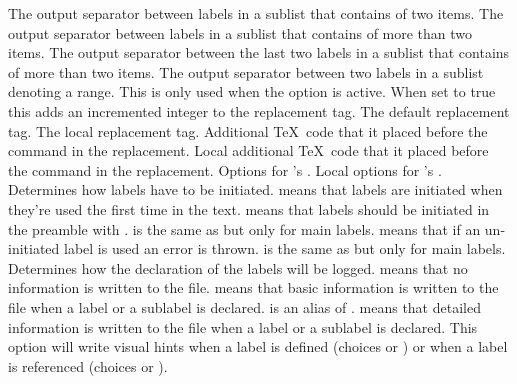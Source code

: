 \documentclass[load-preamble+,babel-options={ngerman,british,american}]{cnltx-doc}
\begin{document}
\begin{options}
    The output separator between labels in a sublist that contains of two
    items.
  \Default{,}
    The output separator between labels in a sublist that contains of more
    than two items.
  \Default{,}
    The output separator between the last two labels in a sublist that
    contains of more than two items.
  \Default{--}
    The output separator between two labels in a sublist denoting a range.
    This is only used when the option  is active.
    When set to true this adds an incremented integer to the replacement tag.
    The default replacement tag.
    The local replacement tag.
    Additional \TeX\ code that it placed before the  command in the
    replacement.
    Local additional \TeX\ code that it placed before the  command in
    the replacement.
    Options for 's .
    Local options for 's .
    Determines how labels have to be initiated.   means that
    labels are initiated when they're used the first time in the text.
     means that labels should be initiated in the preamble with
    .   is the same as  but only for main
    labels.   means that if an un-initiated label is used an
    error is thrown.   is the same as  but only
    for main labels.
    Determines how the declaration of the labels will be logged.  
    means that no information is written to the  file.  
    means that basic information is written to the  file when a
    label or a sublabel is declared.   is an alias of
    .   means that detailed information is written to
    the  file when a label or a sublabel is declared.
    This option will write visual hints when a label is defined (choices
     or ) or when a label is referenced (choices
     or ).
\end{options}
\end{document}
